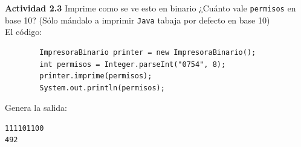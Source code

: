 \documentclass[11pt,letterpaper]{article}
\begin{document}
\textbf{Actividad 2.3} Imprime como se ve esto en binario ¿Cuánto vale \texttt{permisos}
en base 10? (Sólo mándalo a imprimir \texttt{Java} tabaja por defecto en base 10) \\

    El código:

    \begin{verbatim}
        ImpresoraBinario printer = new ImpresoraBinario();
        int permisos = Integer.parseInt("0754", 8);
        printer.imprime(permisos);
        System.out.println(permisos);
    \end{verbatim}

    Genera la salida:
    \begin{verbatim}
111101100
492
    \end{verbatim}
\end{document}
